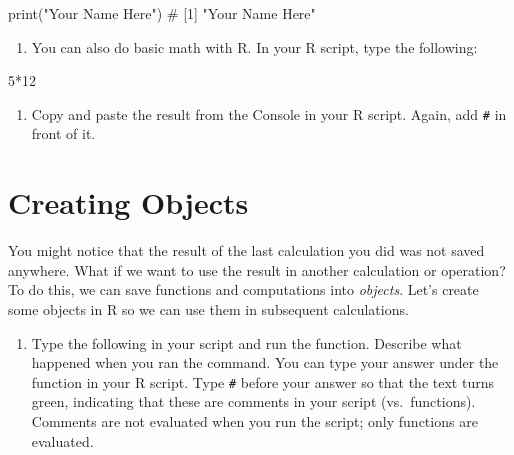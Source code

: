 \documentclass[
]{article}
\newenvironment{Shaded}{\begin{snugshade}}{\end{snugshade}}
\newcommand{\CommentTok}[1]{\textcolor[rgb]{0.37,0.37,0.37}{#1}}
\newcommand{\DecValTok}[1]{\textcolor[rgb]{0.68,0.00,0.00}{#1}}
\newcommand{\FunctionTok}[1]{\textcolor[rgb]{0.28,0.35,0.67}{#1}}
\newcommand{\NormalTok}[1]{\textcolor[rgb]{0.00,0.23,0.31}{#1}}
\newcommand{\SpecialCharTok}[1]{\textcolor[rgb]{0.37,0.37,0.37}{#1}}
\newcommand{\StringTok}[1]{\textcolor[rgb]{0.13,0.47,0.30}{#1}}
\providecommand{\tightlist}{%
  \setlength{\itemsep}{0pt}\setlength{\parskip}{0pt}}
\begin{document}
\begin{Shaded}
\begin{Highlighting}[]
\FunctionTok{print}\NormalTok{(}\StringTok{"Your Name Here"}\NormalTok{)}
\CommentTok{\# [1] "Your Name Here"}
\end{Highlighting}
\end{Shaded}

\begin{enumerate}
\def\labelenumi{\arabic{enumi})}
\setcounter{enumi}{4}
\tightlist
\item
  You can also do basic math with R. In your R script, type the
  following:
\end{enumerate}

\begin{Shaded}
\begin{Highlighting}[]
\DecValTok{5}\SpecialCharTok{*}\DecValTok{12}
\end{Highlighting}
\end{Shaded}

\begin{enumerate}
\def\labelenumi{\arabic{enumi})}
\setcounter{enumi}{5}
\tightlist
\item
  Copy and paste the result from the Console in your R script. Again,
  add \texttt{\#} in front of it.
\end{enumerate}

\section{Creating Objects}\label{creating-objects}

You might notice that the result of the last calculation you did was not
saved anywhere. What if we want to use the result in another calculation
or operation? To do this, we can save functions and computations into
\emph{objects}. Let's create some objects in R so we can use them in
subsequent calculations.

\begin{enumerate}
\def\labelenumi{\arabic{enumi})}
\tightlist
\item
  Type the following in your script and run the function. Describe what
  happened when you ran the command. You can type your answer under the
  function in your R script. Type \texttt{\#} before your answer so that
  the text turns green, indicating that these are comments in your
  script (vs.~functions). Comments are not evaluated when you run the
  script; only functions are evaluated.
\end{enumerate}
\end{document}
